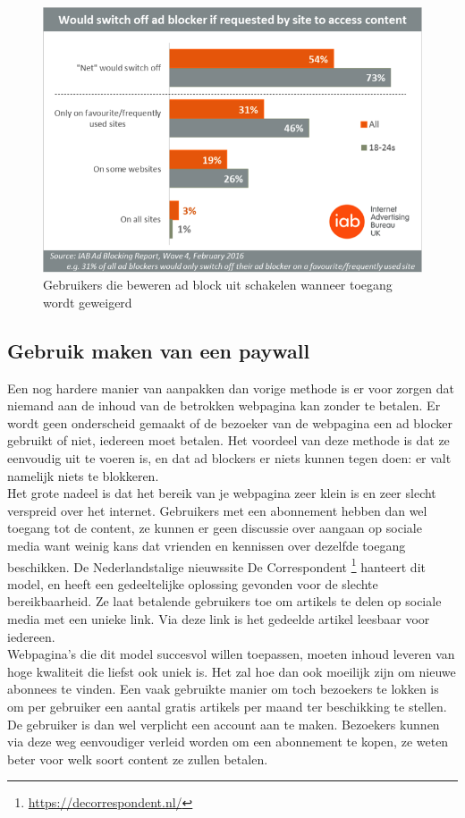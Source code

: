 \documentclass[pdftex,a4paper,12pt,twoside]{report}
\begin{document}
\begin{figure}[h!]
\centering
\includegraphics[width=12cm]{img/Adblockblock}
\caption{Gebruikers die beweren ad block uit schakelen wanneer toegang wordt geweigerd}
\label{fig: Adblockblock}
\end{figure}

\subsection{Gebruik maken van een paywall}
\label{sec Gebruik maken van een paywall}
Een nog hardere manier van aanpakken dan vorige methode is er voor zorgen dat niemand aan de inhoud van de betrokken webpagina kan zonder te betalen. Er wordt geen onderscheid gemaakt of de bezoeker van de webpagina een ad blocker gebruikt of niet, iedereen moet betalen. Het voordeel van deze methode is dat ze eenvoudig uit te voeren is, en dat ad blockers er niets kunnen tegen doen: er valt namelijk niets te blokkeren.
\\
Het grote nadeel is dat het bereik van je webpagina zeer klein is en zeer slecht verspreid over het internet. Gebruikers met een abonnement hebben dan wel toegang tot de content, ze kunnen er geen discussie over aangaan op sociale media want weinig kans dat vrienden en kennissen over dezelfde toegang beschikken. De Nederlandstalige nieuwssite De Correspondent \footnote{\url{https://decorrespondent.nl/}} hanteert dit model, en heeft een gedeeltelijke oplossing gevonden voor de slechte bereikbaarheid. Ze laat betalende gebruikers toe om artikels te delen op sociale media met een unieke link. Via deze link is het gedeelde artikel leesbaar voor iedereen.
\\ 
Webpagina's die dit model succesvol willen toepassen, moeten inhoud leveren van hoge kwaliteit die liefst ook uniek is. Het zal hoe dan ook moeilijk zijn om nieuwe abonnees te vinden. Een vaak gebruikte manier om toch bezoekers te lokken is om per gebruiker een aantal gratis artikels per maand ter beschikking te stellen. De gebruiker is dan wel verplicht een account aan te maken. Bezoekers kunnen via deze weg eenvoudiger verleid worden om een abonnement te kopen, ze weten beter voor welk soort content ze zullen betalen.
\end{document}
